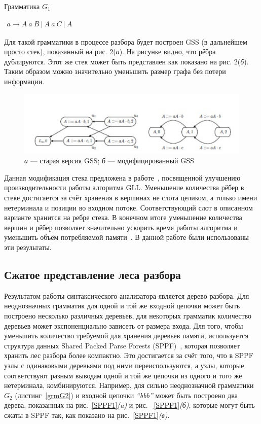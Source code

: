 \documentclass[14pt]{matmex-diploma}
\begin{document}
\begin{listing}
\caption{Грамматика $G_1$}
\label{grmG1}
\centering
$\begin{array}{rl}
a \rightarrow A \ a \ B \ | \ A \ a \ C \ | \ A
\end{array}$

\end{listing}
Для такой грамматики в процессе разбора будет построен GSS (в дальнейшем просто стек), показанный на рис. 2({\it а}). На рисунке видно, что рёбра дублируются. Этот же стек может быть представлен как показано на рис. 2({\it б}). Таким образом можно значительно уменьшить размер графа без потери информации. 

\begin{figure}
 \centering
 \includegraphics[width=15cm]{pics/GSSNew.pdf}
 \caption{{\it а} --- старая версия GSS;  {\it б} --- модифицированный GSS }
 \label{GSS2}
\end{figure}

Данная модификация стека предложена в работе~\cite{Afroozeh2015}, посвященной улучшению производительности работы алгоритма GLL. Уменьшение количества рёбер в стеке достигается за счёт хранения в вершинах не слота целиком, а только имени нетерминала и позиции во входном потоке. Соответствующий слот в описанном варианте хранится на ребре стека. В конечном итоге уменьшение количества вершин и рёбер позволяет значительно ускорить время работы алгоритма и уменьшить объём потребляемой памяти~\cite{Afroozeh2015}. В данной работе были использованы эти результаты.

\subsection{Сжатое представление леса разбора}
Результатом работы синтаксического анализатора является дерево разбора. Для неоднозначных грамматик для одной и той же входной цепочки может быть построено несколько различных деревьев, для некоторых грамматик количество деревьев может экспоненциально зависеть от размера входа. Для того, чтобы уменьшить количество требуемой для хранения деревьев памяти, используется структура данных Shared Packed Parse Forests (SPPF)~\cite{SPPF}, которая позволяет хранить лес разбора более компактно. Это достигается за счёт того, что в SPPF узлы с одинаковыми деревьями под ними переиспользуются, а узлы, которые соответствуют разным выводам одной и той же цепочки из одного и того же нетерминала, комбинируются. Например, для сильно неоднозначной грамматики $G_2$ (листинг~\ref{grmG2}) и входной цепочки  {\it ``bbb''} может быть построено два дерева, показанных на рис.~\ref{SPPF1}{\it (a)} и рис. ~\ref{SPPF1}{\it (б)}, которые могут быть сжаты в SPPF так, как показано на рис.~\ref{SPPF1}{\it (в)}.
\end{document}

